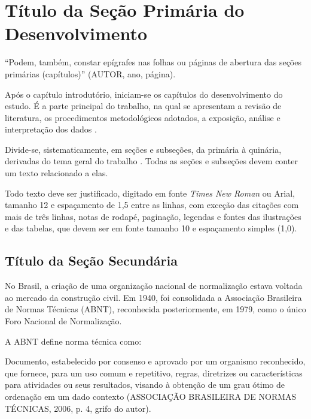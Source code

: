 \chapter{Título da Seção Primária do Desenvolvimento}

\begin{SingleSpace}
    \begin{flushright}
        \begin{minipage}[b]{8cm}
            \begin{small}
                ``Podem, também, constar epígrafes nas folhas ou páginas de abertura das seções primárias (capítulos)'' (AUTOR, ano, página).
            \end{small}
        \end{minipage}
    \end{flushright}
\end{SingleSpace}

Após o capítulo introdutório, iniciam-se os capítulos do desenvolvimento do estudo. É a parte principal do trabalho, na qual se apresentam a revisão de literatura, os procedimentos metodológicos adotados, a exposição, análise e interpretação dos dados \cite{koche,marconi}.

Divide-se, sistematicamente, em seções e subseções, da primária à quinária, derivadas do tema geral do trabalho \cite{barros}. Todas as seções e subseções devem conter um texto relacionado a elas.

Todo texto deve ser justificado, digitado em fonte \textit{Times New Roman} ou Arial, tamanho 12 e espaçamento de 1,5 entre as linhas, com exceção das citações com mais de três linhas, notas de rodapé, paginação, legendas e fontes das ilustrações e das tabelas, que devem ser em fonte tamanho 10 e espaçamento simples (1,0).

\section{Título da Seção Secundária}

No Brasil, a criação de uma organização nacional de normalização estava voltada ao mercado da construção civil. Em 1940, foi consolidada a Associação Brasileira de Normas Técnicas (ABNT), reconhecida posteriormente, em 1979, como o único Foro Nacional de Normalização.

A ABNT define norma técnica como:

\begin{SingleSpace}
    \begin{flushright}
        \begin{minipage}[b]{12cm}
            \begin{small}
                Documento, estabelecido por consenso e aprovado por um organismo reconhecido, que fornece, para um uso comum e repetitivo, regras, diretrizes ou características para atividades ou seus resultados, visando à obtenção de um grau ótimo de ordenação em um dado contexto (ASSOCIAÇÃO BRASILEIRA DE NORMAS TÉCNICAS, 2006, p. 4, grifo do autor).
            \end{small}
        \end{minipage}
    \end{flushright}
\end{SingleSpace}

